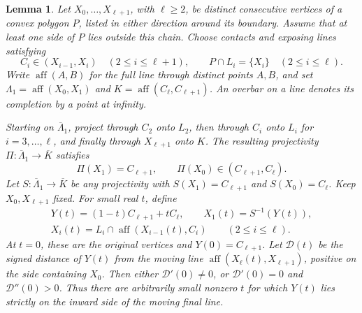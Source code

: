 \documentclass[11pt,a4paper]{article}
\DeclareMathOperator{\aff}{aff}
\newtheorem{lemma}[theorem]{Lemma}
\theoremstyle{definition}
\theoremstyle{remark}
\numberwithin{equation}{section}
\begin{document}
\begin{lemma}\label{lem:chain-holonomy}
Let $X_0,\ldots,X_{\ell+1}$, with $\ell\ge2$, be distinct consecutive vertices of a convex polygon $P$, listed in either direction around its boundary. Assume that at least one side of $P$ lies outside this chain. Choose contacts and exposing lines satisfying
\[
 C_i\in(X_{i-1},X_i)\quad(2\le i\le\ell+1),
 \qquad P\cap L_i=\{X_i\}\quad(2\le i\le\ell).
\]
Write $\aff(A,B)$ for the full line through distinct points $A,B$, and set $\Lambda_1=\aff(X_0,X_1)$ and $K=\aff(C_\ell,C_{\ell+1})$. An overbar on a line denotes its completion by a point at infinity.

Starting on $\overline\Lambda_1$, project through $C_2$ onto $L_2$, then through $C_i$ onto $L_i$ for $i=3,\ldots,\ell$, and finally through $X_{\ell+1}$ onto $K$. The resulting projectivity $\Pi:\overline\Lambda_1\to\overline K$ satisfies
\begin{equation}\label{eq:strict-holonomy}
 \Pi(X_1)=C_{\ell+1},\qquad
 \Pi(X_0)\in(C_{\ell+1},C_\ell).
\end{equation}
Let $S:\overline\Lambda_1\to\overline K$ be any projectivity with $S(X_1)=C_{\ell+1}$ and $S(X_0)=C_\ell$. Keep $X_0,X_{\ell+1}$ fixed. For small real $t$, define
\[
 \begin{gathered}
 Y(t)=(1-t)C_{\ell+1}+tC_\ell,\qquad X_1(t)=S^{-1}(Y(t)),\\
 X_i(t)=L_i\cap\aff(X_{i-1}(t),C_i)\qquad(2\le i\le\ell).
 \end{gathered}
\]
At $t=0$, these are the original vertices and $Y(0)=C_{\ell+1}$. Let $\mathcal D(t)$ be the signed distance of $Y(t)$ from the moving line $\aff(X_\ell(t),X_{\ell+1})$, positive on the side containing $X_0$. Then either $\mathcal D'(0)\ne0$, or $\mathcal D'(0)=0$ and $\mathcal D''(0)>0$. Thus there are arbitrarily small nonzero $t$ for which $Y(t)$ lies strictly on the inward side of the moving final line.
\end{lemma}
\end{document}
